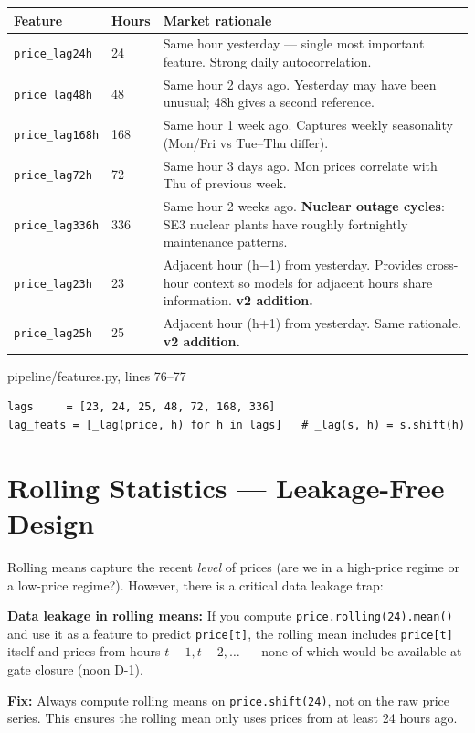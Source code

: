 \documentclass[12pt, a4paper, oneside]{memoir}
\newcommand{\code}[1]{\texttt{\footnotesize #1}}
\begin{document}
\begin{center}
\begin{tabularx}{\linewidth}{llX}
\toprule
\textbf{Feature} & \textbf{Hours} & \textbf{Market rationale} \\
\midrule
\code{price\_lag24h}  & 24  & Same hour yesterday --- single most important feature. Strong daily autocorrelation. \\
\code{price\_lag48h}  & 48  & Same hour 2 days ago. Yesterday may have been unusual; 48h gives a second reference. \\
\code{price\_lag168h} & 168 & Same hour 1 week ago. Captures weekly seasonality (Mon/Fri vs Tue--Thu differ). \\
\code{price\_lag72h}  & 72  & Same hour 3 days ago. Mon prices correlate with Thu of previous week. \\
\code{price\_lag336h} & 336 & Same hour 2 weeks ago. \textbf{Nuclear outage cycles}: SE3 nuclear plants have roughly fortnightly maintenance patterns. \\
\code{price\_lag23h}  & 23  & Adjacent hour (h$-$1) from yesterday. Provides cross-hour context so models for adjacent hours share information. \textbf{v2 addition.} \\
\code{price\_lag25h}  & 25  & Adjacent hour (h$+$1) from yesterday. Same rationale. \textbf{v2 addition.} \\
\bottomrule
\end{tabularx}
\end{center}

\begin{codefile}{pipeline/features.py, lines 76--77}
\begin{verbatim}
lags     = [23, 24, 25, 48, 72, 168, 336]
lag_feats = [_lag(price, h) for h in lags]   # _lag(s, h) = s.shift(h)
\end{verbatim}
\end{codefile}

\section{Rolling Statistics --- Leakage-Free Design}

Rolling means capture the recent \emph{level} of prices (are we in a high-price regime
or a low-price regime?). However, there is a critical data leakage trap:

\begin{warningbox}
\textbf{Data leakage in rolling means:} If you compute \code{price.rolling(24).mean()}
and use it as a feature to predict \code{price[t]}, the rolling mean includes
\code{price[t]} itself and prices from hours $t-1, t-2, \ldots$ --- none of which
would be available at gate closure (noon D-1).

\textbf{Fix:} Always compute rolling means on \code{price.shift(24)}, not on
the raw price series. This ensures the rolling mean only uses prices from at least
24 hours ago.
\end{warningbox}
\end{document}
